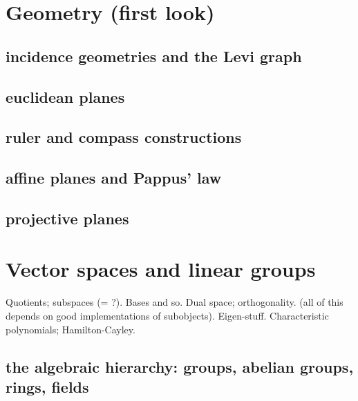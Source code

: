 
\usepackage[notref,notcite]{showkeys}
\renewcommand*{\showkeyslabelformat}[1]{%
  {\rotatebox[origin=cr]{60}{\normalfont\tiny\ttfamily#1}}}
%



\frontmatter
\thetitlepage

\renewcommand*{\contentsname}{Short contents}
\setcounter{tocdepth}{0} %
\tableofcontents
\clearpage
\renewcommand*{\contentsname}{Contents}
\setcounter{tocdepth}{1} %
\tableofcontents

%

\mainmatter











\chapter{Geometry (first look)}
\section{incidence geometries and the Levi graph}
\section{euclidean planes}
\section{ruler and compass constructions}
\section{affine planes and Pappus' law}
\section{projective planes}
\chapter{Vector spaces and linear groups}
Quotients; subspaces (= ?). Bases and so. Dual space; orthogonality. (all of this depends on good implementations of subobjects). Eigen-stuff. Characteristic polynomials; Hamilton-Cayley. 
\section{the algebraic hierarchy: groups, abelian groups, rings, fields}
